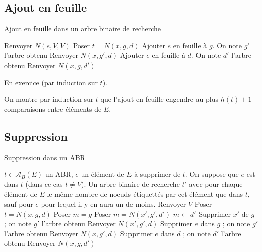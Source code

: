 \documentclass{scrartcl}
\begin{document}
		\subsection{Ajout en feuille}
			\begin{algorithm}[H]
				\caption{Ajout en feuille dans un arbre binaire de recherche}
				{
					Renvoyer $N(e,V,V)$
				}
				{
					Poser $t = N(x,g,d)$ \;
					{
						Ajouter $e$ en feuille à $g$. On note $g'$ l'arbre obtenu \;
						Renvoyer $N(x,g',d)$
					}
					{
						Ajouter $e$ en feuille à $d$. On note $d'$ l'arbre obtenu \;
						Renvoyer $N(x,g,d')$
					}
				}
			\end{algorithm}

			\begin{demo}
				\item En exercice (par induction sur $t$).
			\end{demo}

			\begin{demo}
				\item On montre par induction sur $t$ que l'ajout en feuille engendre au plus $h(t) + 1$ comparaisons entre éléments de $E$.
			\end{demo}

		\subsection{Suppression}
			\begin{algorithm}[H]
				\caption{Suppression dans un ABR}
				\Entree
				{
					$t \in \mathscr{A}_B(E)$ un ABR, $e$ un élément de $E$ à supprimer de $t$. On suppose que $e$ est dans $t$ (dans ce cas $t \neq V$).
				}
				\Sortie
				{
					Un arbre binaire de recherche $t'$ avec pour chaque élément de $E$ le même nombre de noeuds étiquettés par cet élément que dans $t$,
					sauf pour $e$ pour lequel il y en aura un de moins.
				}
				{
					{
						Renvoyer $V$
					}
					{
						Poser $t = N(x,g,d)$ \;
						{
							Poser $m = g$ \;
							{
								Poser $m = N(x',g',d')$ \;
								$m \leftarrow d'$
							}
							Supprimer $x'$ de $g$ ; on note $g'$ l'arbre obtenu \;
							Renvoyer $N(x',g',d)$ 
						}
						{
							{
								Supprimer $e$ dans $g$ ; on note $g'$ l'arbre obtenu \;
								Renvoyer $N(x,g',d)$
							}
							{
								Supprimer $e$ dans $d$ ; on note $d'$ l'arbre obtenu \;
								Renvoyer $N(x,g,d')$
							}
						}
					}
				}
			\end{algorithm}
\end{document}
